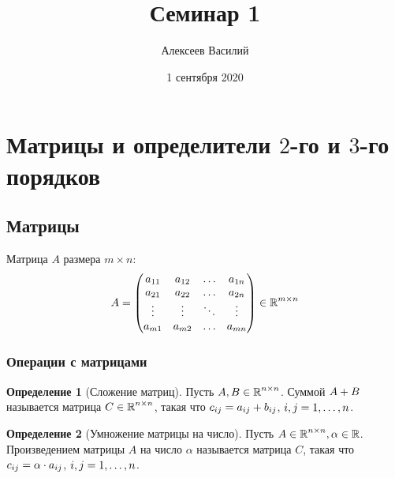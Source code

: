 \documentclass[a4paper,12pt]{article}
\author{Алексеев Василий}
\title{Семинар 1}
\date{1 сентября 2020}
\theoremstyle{definition}
\newtheorem{definition}{Определение}[section]
\theoremstyle{remark}
\theoremstyle{remark}
\theoremstyle{remark}
\begin{document}
  \maketitle
  
  \tableofcontents

  \thispagestyle{empty}
  
  \newpage
  


  \section{Матрицы и определители $2$-го и $3$-го порядков}

  \subsection{Матрицы}

  Матрица $A$ размера $m \times n$:
  \[
    A = \begin{pmatrix}
      a_{11} & a_{12} & \ldots & a_{1n}\\
      a_{21} & a_{22} & \ldots & a_{2n}\\
      \vdots & \vdots & \ddots & \vdots\\
      a_{m1} & a_{m2} & \ldots & a_{mn}
    \end{pmatrix} \in \operatorname{\mathbb R}^{m \times n}
  \]
  
  
  \subsubsection{Операции с матрицами}
  
  \begin{definition}[Сложение матриц]
    Пусть $A, B \in \operatorname{\mathbb R}^{n \times n}$.
    Суммой $A \hm+ B$ называется матрица $C \hm\in \RR^{n \times n}$, такая что
    $c_{ij} \hm= a_{ij} + b_{ij}$, $i, j \hm= 1, \ldots, n$.
  \end{definition}
  
  \begin{definition}[Умножение матрицы на число]
    Пусть $A \in \operatorname{\mathbb R}^{n \times n}, \alpha \in \operatorname{\mathbb R}$.
    Произведением матрицы $A$ на число $\alpha$ называется матрица $C$, такая что
    $c_{ij} \hm= \alpha \cdot a_{ij}$, $i, j \hm= 1, \ldots, n$.
  \end{definition}
  
\end{document}
